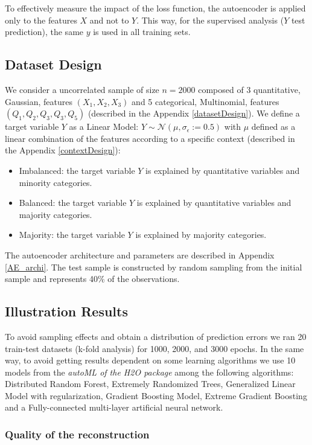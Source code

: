 \documentclass{article}
\theoremstyle{definition}
\begin{document}
To effectively measure the impact of the loss function, the autoencoder is applied only to the features $X$ and not to $Y$. This way, for the supervised analysis ($Y$ test prediction), the same $y$ is used in all training sets.


\subsection{Dataset Design}
We consider a uncorrelated sample of size $n=2000$ composed of 3 quantitative, Gaussian, features $(X_1, X_2, X_3)$ and 5 categorical, Multinomial, features $(Q_1, Q_2, Q_3, Q_3, Q_5)$ (described in the Appendix \ref{datasetDesign}). 
We define a target variable $Y$ as a Linear Model:    $Y \sim \mathcal{N}(\mu, \sigma_\epsilon:=0.5)$
with $\mu$ defined as a linear combination of the features according to a specific context (described in the Appendix \ref{contextDesign}):
\begin{itemize}
    \item Imbalanced: the target variable $Y$ is explained by quantitative variables and minority categories. 
    \item Balanced: the target variable $Y$ is explained by quantitative variables and majority categories.
    \item Majority: the target variable $Y$ is explained by majority categories.
\end{itemize}
The autoencoder architecture and parameters are described in Appendix \ref{AE_archi}.
The test sample is constructed by random sampling from the initial sample and represents 40\% of the observations.


\subsection{Illustration Results}\label{Illu_Results}

To avoid sampling effects and obtain a distribution of prediction errors we ran 20 train-test datasets (k-fold analysis) for 1000, 2000, and 3000 epochs. In the same way, to avoid getting results dependent on some learning algorithms we use 10 models from the \textit{autoML of the H2O package} \citep{H2OAutoML20} among the following algorithms: Distributed Random Forest, Extremely Randomized Trees, Generalized Linear Model with regularization, Gradient Boosting Model, Extreme Gradient Boosting and a Fully-connected multi-layer artificial neural network. 


\subsubsection{Quality of the reconstruction}
\end{document}
